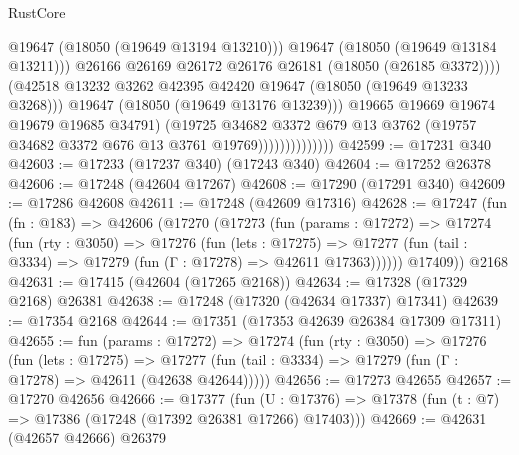 \begin{lexlean}{RustCore}
\begin{coremodule}
                                        @19647
                                        (@18050 (@19649 @13194 @13210)))
                                      @19647
                                      (@18050 (@19649 @13184 @13211)))
                                    @26166
                                    @26169
                                    @26172
                                    @26176
                                    @26181
                                    (@18050 (@26185 @3372))))
                                (@42518
                                  @13232
                                  @3262
                                  @42395
                                  @42420
                                  @19647
                                  (@18050 (@19649 @13233 @3268)))
                                @19647
                                (@18050 (@19649 @13176 @13239)))
                              @19665
                              @19669
                              @19674
                              @19679
                              @19685
                              @34791)
                            (@19725
                              @34682
                              @3372
                              @679
                              @13
                              @3762
                              (@19757 @34682 @3372 @676 @13 @3761 @19769))))))))))))))
@42599 := @17231 @340
@42603 := @17233 (@17237 @340) (@17243 @340)
@42604 := @17252 @26378
@42606 := @17248 (@42604 @17267)
@42608 := @17290 (@17291 @340)
@42609 := @17286 @42608
@42611 := @17248 (@42609 @17316)
@42628 := @17247
    (fun (fn : @183) =>
    @42606
      (@17270
        (@17273
          (fun (params : @17272) =>
          @17274
            (fun (rty : @3050) =>
            @17276
              (fun (lets : @17275) =>
              @17277 (fun (tail : @3334) => @17279 (fun (Γ : @17278) => @42611 @17363))))))
        @17409))
    @2168
@42631 := @17415 (@42604 (@17265 @2168))
@42634 := @17328 (@17329 @2168) @26381
@42638 := @17248 (@17320 (@42634 @17337) @17341)
@42639 := @17354 @2168
@42644 := @17351 (@17353 @42639 @26384 @17309 @17311)
@42655 := fun (params : @17272) =>
  @17274
    (fun (rty : @3050) =>
    @17276
      (fun (lets : @17275) =>
      @17277 (fun (tail : @3334) => @17279 (fun (Γ : @17278) => @42611 (@42638 @42644)))))
@42656 := @17273 @42655
@42657 := @17270 @42656
@42666 := @17377
    (fun (U : @17376) => @17378 (fun (t : @7) => @17386 (@17248 (@17392 @26381 @17266) @17403)))
@42669 := @42631 (@42657 @42666) @26379

\end{coremodule}
\end{lexlean}
